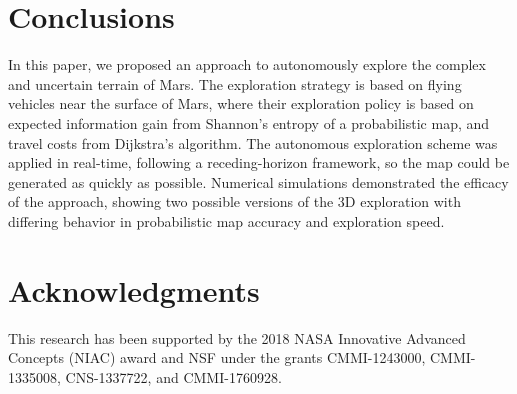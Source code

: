 \documentclass[conf]{new-aiaa}
\begin{document}
\section{Conclusions}

In this paper, we proposed an approach to autonomously explore the complex and uncertain terrain of Mars. The exploration strategy is based on flying vehicles near the surface of Mars, where their exploration policy is based on expected information gain from Shannon's entropy of a probabilistic map, and travel costs from Dijkstra's algorithm. The autonomous exploration scheme was applied in real-time, following a receding-horizon framework, so the map could be generated as quickly as possible. Numerical simulations demonstrated the efficacy of the approach, showing two possible versions of the 3D exploration with differing behavior in probabilistic map accuracy and exploration speed.

\section*{Acknowledgments}
This research has been supported by the 2018 NASA Innovative Advanced Concepts (NIAC) award and NSF under the grants CMMI-1243000, CMMI-1335008, CNS-1337722, and CMMI-1760928.

\end{document}
